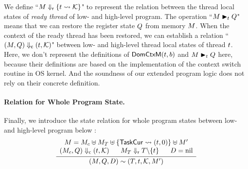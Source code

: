 We define ``${M} \Downarrow_{\textsf{r}} {\{ t \rightsquigarrow \mathcal{K} \}}$" 
to represent the relation between the thread local states of 
{\it ready thread} of low- and high-level program. The operation 
``${M} \blacktriangleright_{t} {Q}$" means that we can restore the 
register state $Q$ from memory $M$. When the context of the 
ready thread has been restored, we can establish a relation 
``${(M, Q)} \Downarrow_{\textsf{c}} {(t, \mathcal{K})}$" 
between low- and high-level thread local states of thread $t$. 
Here, we don't represent the definitions of $\textsf{DomCtxM}{(t, b)}$ 
and ${M} \blacktriangleright_{t} {Q}$ here, because their definitions 
are based on the implementation of the context switch routine in 
OS kernel. And the soundness of our extended program logic does not 
rely on their concrete definition. 

\paragraph{\bf Relation for Whole Program State. } 
Finally, we introduce the state relation for whole program states between 
low- and high-level program below : 
\[
    \infer
    {
        \stateRel{(\Mem, \Rstate, \DBuf)}
            {(\thrdpool, \thrdid, \hthrdlocalst, \Mem')}
    }
    {
        \begin{array}{c}
            \Mem = \Mem_c \uplus \Mem_T \uplus 
                \{ \TaskCur \rightsquigarrow (\thrdid, 0) \}
                \uplus \Mem' \\
            \curStRel{(\Mem_c, \Rstate)}{(\thrdid, \hthrdlocalst)}
            \quad \ \ 
            \rdyStRel{\Mem_T}{\thrdpool \backslash \{ \thrdid \}}
            \quad \ \ 
            \DBuf = \nil
        \end{array}
    }
\]